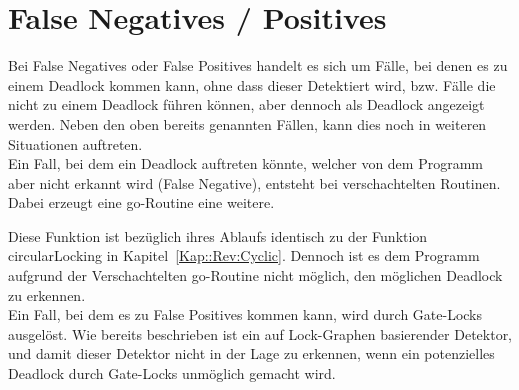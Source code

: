 \section{False Negatives / Positives} \label{Kap::Rev:False}
Bei False Negatives oder False Positives handelt es sich um Fälle, bei denen es 
zu einem Deadlock kommen kann, ohne dass dieser Detektiert wird, bzw. Fälle die
nicht zu einem 
Deadlock führen können, aber dennoch als Deadlock angezeigt werden. 
Neben den oben bereits genannten Fällen, kann dies noch in weiteren Situationen
auftreten.\\
Ein Fall,
bei dem ein Deadlock auftreten könnte, welcher von dem Programm aber nicht erkannt
wird (False Negative), entsteht bei verschachtelten Routinen. Dabei erzeugt eine go-Routine eine 
weitere.
\begin{figure}[H]
    
\end{figure}
Diese Funktion ist bezüglich ihres Ablaufs identisch zu der Funktion 
circularLocking in Kapitel~\ref*{Kap::Rev:Cyclic}. Dennoch ist es dem 
Programm aufgrund der Verschachtelten go-Routine nicht möglich, den möglichen 
Deadlock zu erkennen. \\
Ein Fall, bei dem es zu False Positives kommen kann, wird durch Gate-Locks
ausgelöst. Wie bereits beschrieben ist ein auf Lock-Graphen basierender Detektor,
und damit dieser Detektor nicht in der Lage zu erkennen, wenn ein 
potenzielles Deadlock durch Gate-Locks unmöglich gemacht wird.
